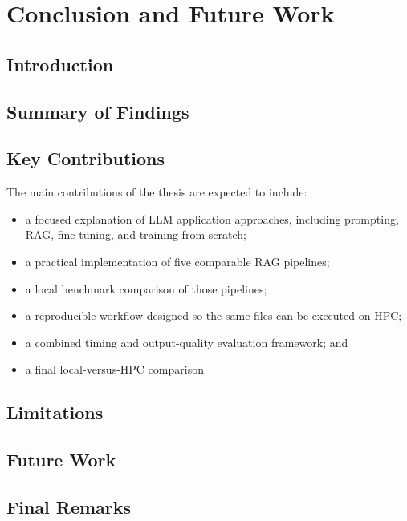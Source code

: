 \chapter{Conclusion and Future Work}

\section{Introduction}


\section{Summary of Findings}


\section{Key Contributions}
The main contributions of the thesis are expected to include:

\begin{itemize}
    \item a focused explanation of LLM application approaches, including prompting, RAG, fine-tuning, and training from scratch;
    \item a practical implementation of five comparable RAG pipelines;
    \item a local benchmark comparison of those pipelines;
    \item a reproducible workflow designed so the same files can be executed on HPC;
    \item a combined timing and output-quality evaluation framework; and
    \item a final local-versus-HPC comparison
\end{itemize}

\section{Limitations}


\section{Future Work}


\section{Final Remarks}

